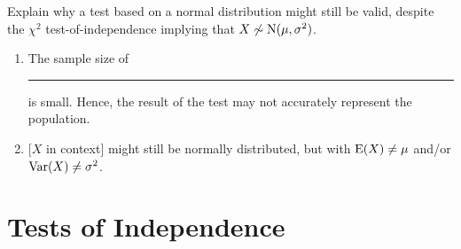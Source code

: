 \documentclass[../Notes.tex]{subfiles}
\begin{document}
\begin{note}
  Explain why a test based on a normal distribution might still be valid, despite the \(\chi^2\) test-of-independence implying that \(X\not\sim\operatorname{N}(\mu,\sigma^2)\).
  \begin{enumerate}
    \item The sample size of \rule{0.5cm}{0.01mm} is small. Hence, the result of the test may not accurately represent the population.
    \item{} [\(X\) in context] might still be normally distributed, but with \(\operatorname{E}(X)\neq\mu\) and/or \(\operatorname{Var}(X)\neq\sigma^2\).
  \end{enumerate} 
\end{note}
\section{Tests of Independence}
\end{document}
